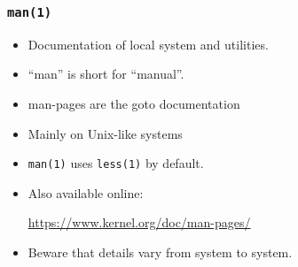 \begin{frame}

\frametitle{\texttt{man(1)}}

\begin{itemize}

\item Documentation of local system and utilities.

\item ``man'' is short for ``manual''.

\item man-pages are the goto documentation

\item Mainly on Unix-like systems

\end{itemize}

\vspace{\fill}

\begin{itemize}

\item \texttt{man(1)} uses \texttt{less(1)} by default.

\item Also available online:

\begin{center}

\url{https://www.kernel.org/doc/man-pages/}

\end{center}

\item Beware that details vary from system to system.

\end{itemize}

\end{frame}
